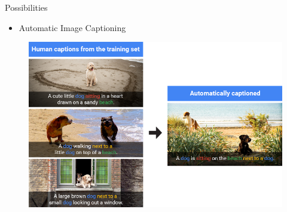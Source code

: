\documentclass[10pt]{beamer}
\begin{document}
	\begin{frame}[t]{Possibilities}
		\begin{itemize}
			\item \large{Automatic Image Captioning}
		\end{itemize}
		\begin{figure}
			\includegraphics[width=\linewidth]{images/ic3}
		\end{figure}
	\end{frame}
\end{document}
